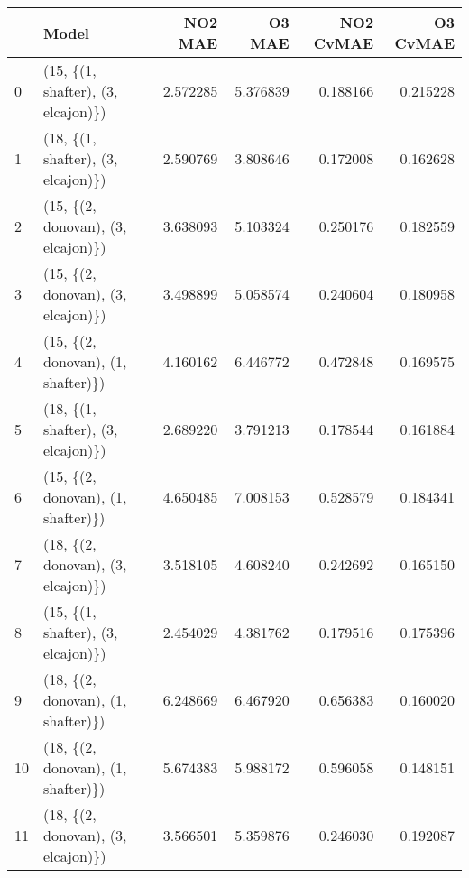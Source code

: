 \begin{tabular}{llrrrr}
\toprule
{} &                               Model &   NO2 MAE &    O3 MAE &  NO2 CvMAE &  O3 CvMAE \\
\midrule
0  &  (15, \{(1, shafter), (3, elcajon)\}) &  2.572285 &  5.376839 &   0.188166 &  0.215228 \\
1  &  (18, \{(1, shafter), (3, elcajon)\}) &  2.590769 &  3.808646 &   0.172008 &  0.162628 \\
2  &  (15, \{(2, donovan), (3, elcajon)\}) &  3.638093 &  5.103324 &   0.250176 &  0.182559 \\
3  &  (15, \{(2, donovan), (3, elcajon)\}) &  3.498899 &  5.058574 &   0.240604 &  0.180958 \\
4  &  (15, \{(2, donovan), (1, shafter)\}) &  4.160162 &  6.446772 &   0.472848 &  0.169575 \\
5  &  (18, \{(1, shafter), (3, elcajon)\}) &  2.689220 &  3.791213 &   0.178544 &  0.161884 \\
6  &  (15, \{(2, donovan), (1, shafter)\}) &  4.650485 &  7.008153 &   0.528579 &  0.184341 \\
7  &  (18, \{(2, donovan), (3, elcajon)\}) &  3.518105 &  4.608240 &   0.242692 &  0.165150 \\
8  &  (15, \{(1, shafter), (3, elcajon)\}) &  2.454029 &  4.381762 &   0.179516 &  0.175396 \\
9  &  (18, \{(2, donovan), (1, shafter)\}) &  6.248669 &  6.467920 &   0.656383 &  0.160020 \\
10 &  (18, \{(2, donovan), (1, shafter)\}) &  5.674383 &  5.988172 &   0.596058 &  0.148151 \\
11 &  (18, \{(2, donovan), (3, elcajon)\}) &  3.566501 &  5.359876 &   0.246030 &  0.192087 \\
\bottomrule
\end{tabular}

